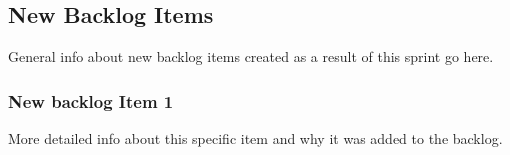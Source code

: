 \resulttable
{
}

\subsection{New Backlog Items}
General info about new backlog items created as a result of this sprint go here.

\subsubsection{New backlog Item 1}
More detailed info about this specific item and why it was added to the backlog.
